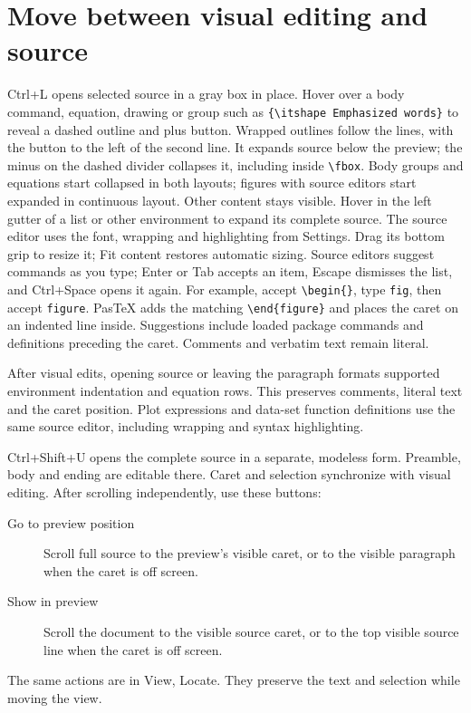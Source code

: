 \documentclass[11pt]{article}
\begin{document}
\section{Move between visual editing and source}
Ctrl+L opens selected source in a gray box in place. Hover over a body command,
equation, drawing or group such as \verb|{\itshape Emphasized words}| to reveal
a dashed outline and plus button. Wrapped outlines follow the lines, with the
button to the left of the second line. It expands source below the preview; the minus
on the dashed divider collapses it, including inside \verb|\fbox|. Body groups
and equations start collapsed in both layouts;
figures with source editors start expanded in continuous layout. Other content stays visible.
Hover in the left gutter of a list or other environment to expand its complete source.
The source editor uses the font, wrapping and highlighting from Settings.
Drag its bottom grip to resize it; Fit content restores automatic sizing.
Source editors suggest commands as you type; Enter or Tab accepts an item,
Escape dismisses the list, and Ctrl+Space opens it again. For example, accept
\verb|\begin{}|, type \texttt{fig}, then accept \texttt{figure}. PasTeX adds
the matching \verb|\end{figure}| and places the caret on an indented line inside.
Suggestions include loaded package commands and definitions preceding the caret.
Comments and verbatim text remain literal.

After visual edits, opening source or leaving the paragraph formats supported
environment indentation and equation rows. This preserves comments, literal
text and the caret position. Plot expressions and data-set function definitions
use the same source editor, including wrapping and syntax highlighting.

Ctrl+Shift+U opens the complete source in a separate, modeless form. Preamble,
body and ending are editable there. Caret and selection synchronize with visual
editing. After scrolling independently, use these buttons:
\begin{description}
\item[Go to preview position] Scroll full source to the preview's visible caret,
or to the visible paragraph when the caret is off screen.
\item[Show in preview] Scroll the document to the visible source caret, or to the
top visible source line when the caret is off screen.
\end{description}
The same actions are in View, Locate. They preserve the text and selection while moving the view.
\end{document}
